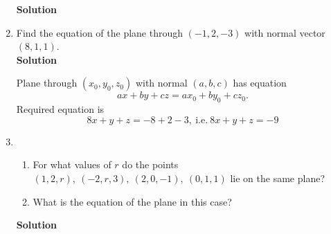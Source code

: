 \begin{enumerate}
\noindent \textbf{Solution} 

\item Find the equation of the plane through $(-1,2,-3)$ with normal vector $(8,1,1)$.\\

\noindent \textbf{Solution}

Plane through $(x_0, y_0, z_0)$ with normal $(a, b, c)$ has equation
$$
ax + by + cz = ax_0 + by_0 + cz_0.
$$
Required equation is
$$
8x + y + z = -8 + 2 -3,\ \mathrm{i.e.}\ 8x+y+z = -9
$$

\item
\begin{enumerate}
\item For what values of $r$ do the points $(1,2,r),\ (-2,r,3),\ (2,0,-1),\ (0,1,1)$ lie on the same plane?
\item What is the equation of the plane in this case?
\end{enumerate}

\noindent \textbf{Solution} 


\end{enumerate}
